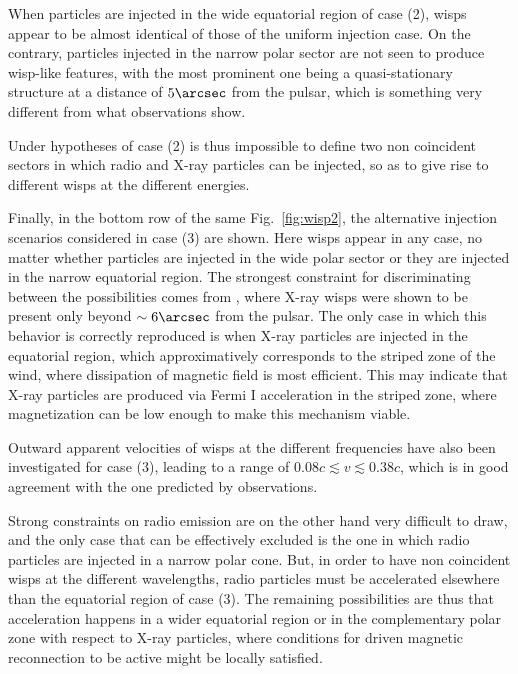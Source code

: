 When particles are injected in the wide equatorial region of case (2), wisps appear to be almost identical of those of the uniform injection case. 
On the contrary, particles injected in the narrow polar sector are not seen to produce wisp-like features, with the most prominent one being a quasi-stationary structure at a distance of $5\arcsec$ from the pulsar, which is something very different from what observations show.

Under hypotheses of case (2) is thus impossible to define two non coincident sectors in which radio and X-ray particles can be injected, so as to give rise to different wisps at the different energies.

Finally, in the bottom row of the same Fig.~\ref{fig:wisp2}, the alternative injection scenarios considered in case (3) are shown. 
Here wisps appear in any case, no matter whether particles are injected in the wide polar sector or they are injected in the narrow equatorial region. 
The strongest constraint for discriminating between the possibilities comes from \citet{Schweizer:2013}, 
where X-ray wisps were shown to be present only beyond $\sim 6\arcsec$ from the pulsar. 
The only case in which this behavior is correctly reproduced is when X-ray particles are injected in the equatorial region, which approximatively corresponds to the striped zone of the wind, where dissipation of magnetic field is most efficient.
This may indicate that X-ray particles are produced via Fermi I acceleration in the striped zone, where magnetization can be low enough to make this mechanism viable.

Outward apparent velocities of wisps at the different frequencies have also been investigated for case (3), leading to a range of $0.08c \lesssim v \lesssim 0.38c$, which is in good agreement with the one predicted by observations.

Strong constraints on radio emission are on the other hand very difficult to draw, and the only case that can be effectively excluded is the one in which radio particles are injected in a narrow polar cone. 
But, in order to have non coincident wisps at the different wavelengths, radio particles must be accelerated elsewhere than the equatorial region of case (3). 
The remaining possibilities are thus that acceleration happens in a wider equatorial region or in the complementary polar zone with respect to X-ray particles, where conditions for driven magnetic reconnection to be active might be locally satisfied.
